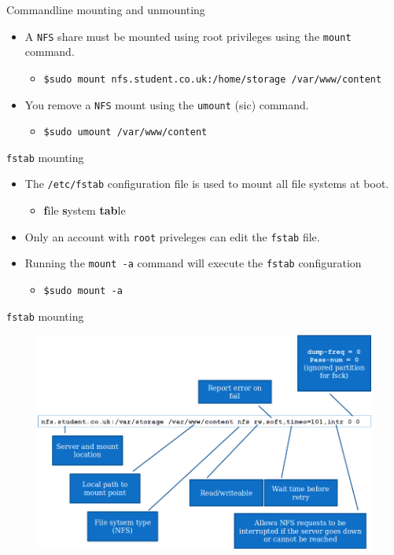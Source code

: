 \documentclass[xcolor=table,aspectratio=169]{beamer}
\begin{document}
\begin{frame}{Commandline mounting and unmounting}
  \begin{itemize}
    \item A \texttt{NFS} share must be mounted using root privileges using the \texttt{mount} command.
      \begin{itemize}
        \item \scriptsize \texttt{\$sudo mount nfs.student.co.uk:/home/storage /var/www/content}
      \end{itemize}
    \item You remove a \texttt{NFS} mount using the \texttt{umount} (sic) command.
      \begin{itemize}
        \item \texttt{\$sudo umount /var/www/content} 
      \end{itemize}
  \end{itemize}
\end{frame}

\begin{frame}{\texttt{fstab} mounting}
  \begin{itemize}
    \item The \texttt{/etc/fstab} configuration file is used to mount all file systems at boot.
      \begin{itemize}
        \item \textbf{f}ile \textbf{s}ystem \textbf{tab}le
      \end{itemize}
    \item Only an account with \texttt{root} priveleges can edit the \texttt{fstab} file.
    \item Running the \texttt{mount -a} command will execute the \texttt{fstab} configuration
      \begin{itemize}
        \item \texttt{\$sudo mount -a} 
      \end{itemize}
  \end{itemize}
\end{frame}

\begin{frame}{\texttt{fstab} mounting}
  \begin{figure}
    \begin{center}
      \includegraphics[width=0.6\linewidth]{fstab.png}
    \end{center}
  \end{figure}
\end{frame}
\end{document}
